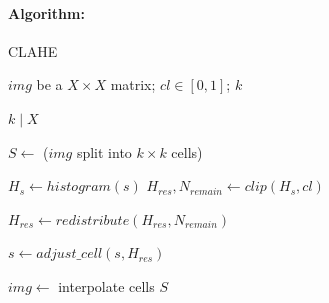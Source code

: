 \paragraph*{Algorithm:}\mbox{}\par

\begin{algorithm}
    \caption{CLAHE}\label{alg:CLAHE}
    \begin{algorithmic}[1]
        \Require $img$ be a $X\times X$ matrix; $cl \in [0, 1]$; $k$

        \Ensure $k \mid X$

        \State $S \gets $ ($img$ split into $k\times k$ cells)\label{line:CLAHE:split}

            \State $H_s \gets histogram(s)$
            \State $H_{res}, N_{remain} \gets clip(H_s, cl)$

            \State $H_{res} \gets redistribute(H_{res}, N_{remain})$\label{line:CLAHE:redistribute}

            \State $s \gets adjust\_cell(s, H_{res})$
        \EndFor

        \State $img \gets$ interpolate cells $S$

    \end{algorithmic}
\end{algorithm}

